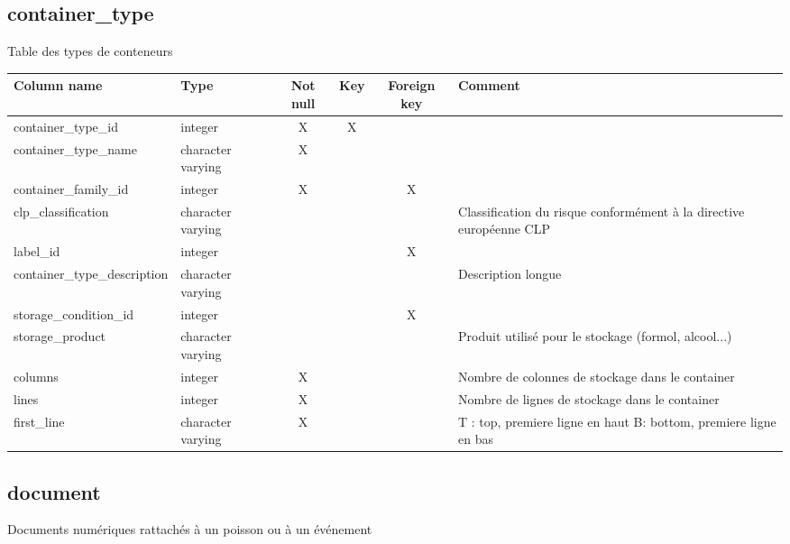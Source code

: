 \subsection{container\_type}
Table des types de conteneurs

\begin{tabular}{|l| p{2cm}|c|c|c| p{3cm}|}
\hline
Column name & Type & Not null & Key & Foreign key & Comment \\
\hline
container\_type\_id & integer & X & X & & \\
\hline
container\_type\_name & character varying & X & & & \\
\hline
container\_family\_id & integer & X & & X & \\
\hline
clp\_classification & character varying & & & & Classification du risque conformément à la directive européenne CLP\\
\hline
label\_id & integer & & & X & \\
\hline
container\_type\_description & character varying & & & & Description longue\\
\hline
storage\_condition\_id & integer & & & X & \\
\hline
storage\_product & character varying & & & & Produit utilisé pour le stockage (formol, alcool...)\\
\hline
columns & integer & X & & & Nombre de colonnes de stockage dans le container\\
\hline
lines & integer & X & & & Nombre de lignes de stockage dans le container\\
\hline
first\_line & character varying & X & & & T : top, premiere ligne en haut B: bottom, premiere ligne en bas\\
\hline
\end{tabular}
\subsection{document}
Documents numériques rattachés à un poisson ou à un événement

